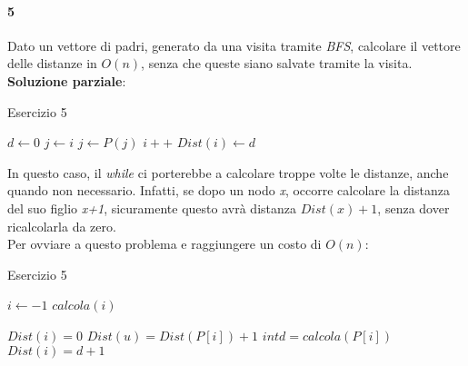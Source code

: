 \paragraph{5}
Dato un vettore di padri, generato da una visita tramite \textit{BFS}, calcolare il vettore delle distanze in $O(n)$, senza che queste siano salvate tramite la visita. \\
\textbf{Soluzione parziale}: \hfill
\begin{algorithm}
	\caption{Esercizio 5}\label{alg:es5}
	\begin{algorithmic}[1]
			\State $d \gets 0$
			\State $j \gets i$
				\State $j \gets P(j)$
				\State $i++$
			\EndWhile
			\State $Dist(i) \gets d$
		\EndFor
		\EndFunction
	\end{algorithmic}
\end{algorithm}
\hfill
In questo caso, il \textit{while} ci porterebbe a calcolare troppe volte le distanze, anche quando non necessario. Infatti, se dopo un nodo \textit{x}, occorre calcolare la distanza del suo figlio \textit{x+1}, sicuramente questo avrà distanza $Dist(x)+1$, senza dover ricalcolarla da zero. \\
Per ovviare a questo problema e raggiungere un costo di $O(n)$:
\begin{algorithm}
	\caption{Esercizio 5}\label{alg:es5-2}
	\begin{algorithmic}[1]
		\State $i \gets -1$
				\State $calcola(i)$
			\EndIf
		\EndFor
		\EndFunction
	\end{algorithmic}
	\begin{algorithmic}[1]
			\State $ Dist(i) = 0 $
			\State $ Dist(u) = Dist(P[i]) + 1$
		\Else
			\State $int d = calcola(P[i])$
			\State $Dist(i) = d+1$
		\EndIf
		\EndFunction
	\end{algorithmic}
\end{algorithm}
\hfill